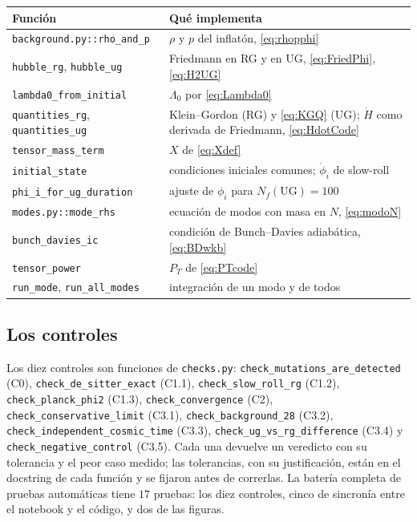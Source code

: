 \begin{table}[h]
\centering\small
\renewcommand{\arraystretch}{1.2}
\begin{tabular}{@{}p{5.1cm}p{9.2cm}@{}}
\toprule
\textbf{Función} & \textbf{Qué implementa}\\
\midrule
\texttt{background.py::rho\_and\_p} & $\rho$ y $p$ del inflatón, \eqref{eq:rhopphi}\\
\texttt{hubble\_rg}, \texttt{hubble\_ug} & Friedmann en RG y en UG, \eqref{eq:FriedPhi}, \eqref{eq:H2UG}\\
\texttt{lambda0\_from\_initial} & $\Lambda_0$ por \eqref{eq:Lambda0}\\
\texttt{quantities\_rg}, \texttt{quantities\_ug} & Klein--Gordon (RG) y \eqref{eq:KGQ} (UG); $\dot H$ como derivada de Friedmann, \eqref{eq:HdotCode}\\
\texttt{tensor\_mass\_term} & $X$ de \eqref{eq:Xdef}\\
\texttt{initial\_state} & condiciones iniciales comunes; $\dot\phi_i$ de slow-roll\\
\texttt{phi\_i\_for\_ug\_duration} & ajuste de $\phi_i$ para $N_f(\mathrm{UG})=100$\\
\texttt{modes.py::mode\_rhs} & ecuación de modos con masa en $N$, \eqref{eq:modoN}\\
\texttt{bunch\_davies\_ic} & condición de Bunch--Davies adiabática, \eqref{eq:BDwkb}\\
\texttt{tensor\_power} & $P_T$ de \eqref{eq:PTcode}\\
\texttt{run\_mode}, \texttt{run\_all\_modes} & integración de un modo y de todos\\
\bottomrule
\end{tabular}
\end{table}

\subsection{Los controles}

Los diez controles son funciones de \texttt{checks.py}: \texttt{check\_mutations\_are\_detected} (C0), \texttt{check\_de\_sitter\_exact} (C1.1), \texttt{check\_slow\_roll\_rg} (C1.2), \texttt{check\_planck\_phi2} (C1.3), \texttt{check\_convergence} (C2), \texttt{check\_conservative\_limit} (C3.1), \texttt{check\_background\_28} (C3.2), \texttt{check\_independent\_cosmic\_time} (C3.3), \texttt{check\_ug\_vs\_rg\_difference} (C3.4) y \texttt{check\_negative\_control} (C3.5). Cada una devuelve un veredicto con su tolerancia y el peor caso medido; las tolerancias, con su justificación, están en el docstring de cada función y se fijaron antes de correrlas. La batería completa de pruebas automáticas tiene $17$ pruebas: los diez controles, cinco de sincronía entre el notebook y el código, y dos de las figuras.

